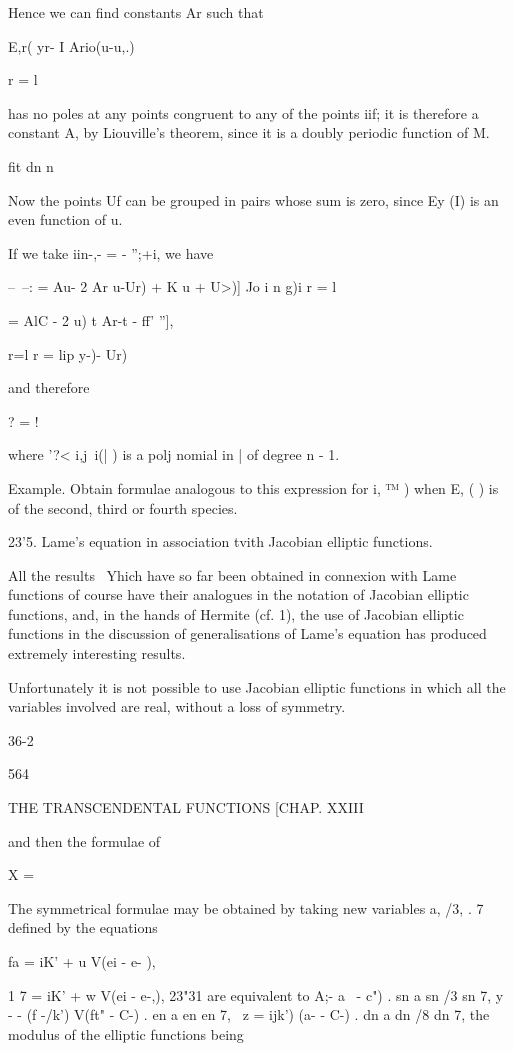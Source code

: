 {{{{{{{Hence we can find constants Ar such that

 E,r( yr- I Ario(u-u,.)

r = l

has no poles at any points congruent to any of the points iif; it is
therefore a constant A, by Liouville's theorem, since it is a doubly
periodic function of M.

fit dn n

Now the points Uf can be grouped in pairs whose sum is zero, since Ey
(I) is an even function of u.

If we take iin-,- = - '';+i, we have

--~--: = Au- 2 Ar u-Ur) + K u + U>)] Jo i n g)i r = l

= AlC - 2 u) t Ar-t - ff' ''],

r=l r = lip y-)- Ur)

and therefore

? = !

where '?< i,j\ i(| ) is a polj nomial in | of degree n - 1.

Example. Obtain formulae analogous to this expression for i, ™ ) when
E, ( ) is of the second, third or fourth species.

23'5. Lame's equation in association tvith Jacobian elliptic
functions.

All the results \ Yhich have so far been obtained in connexion with
Lame functions of course have their analogues in the notation of
Jacobian elliptic functions, and, in the hands of Hermite (cf.
1), the use of Jacobian elliptic functions in the discussion of
generalisations of Lame's equation has produced extremely interesting
results.

Unfortunately it is not possible to use Jacobian elliptic functions in
which all the variables involved are real, without a loss of symmetry.

36-2

564

THE TRANSCENDENTAL FUNCTIONS [CHAP. XXIII

and then the formulae of

X =

The symmetrical formulae may be obtained by taking new variables a,
/3, . 7 defined by the equations

fa = iK' + u V(ei - e- ),

1 7 = iK' + w V(ei - e-,), 23"31 are equivalent to A;- \/ a~ - c") .
sn a sn /3 sn 7, y - - (f -/k') V(ft" - C-) . en a en en 7, \ z =
ijk') \/(a- - C-) . dn a dn /8 dn 7, the modulus of the elliptic
functions being

}}}}}}}
